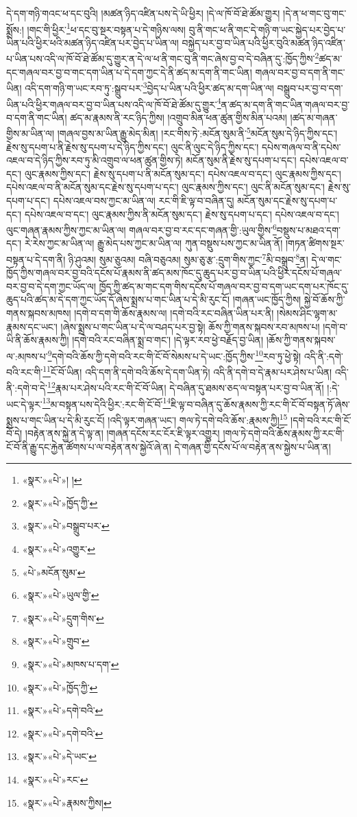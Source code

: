 དེ་དག་གཉི་གའང་ཕ་དང་བུའི། །མཚན་ཉིད་འཛིན་པས་དེ་ཡི་ཕྱིར། །དེ་ལ་ཁོ་བོ་ཐེ་ཚོམ་གྱུར། །དེ་ན་ཕ་གང་བུ་གང་སྨྲོས:། །གང་གི་ཕྱིར་\footnote{«སྣར་»«པེ་»། །}ཕ་དང་བུ་སྔར་བསྟན་པ་དེ་གཉིས་ལས། བུ་ནི་གང་ཕ་ནི་གང་དེ་གཉི་ག་ཡང་སྐྱེད་པར་བྱེད་པ་ཡིན་པའི་ཕྱིར་ཕའི་མཚན་ཉིད་འཛིན་པར་བྱེད་པ་ཡིན་ལ། བསྐྱེད་པར་བྱ་བ་ཡིན་པའི་ཕྱིར་བུའི་མཚན་ཉིད་འཛིན་པ་ཡིན་པས་འདི་ལ་ཁོ་བོ་ཐེ་ཚོམ་དུ་གྱུར་ན་དེ་ལ་ཕ་ནི་གང་བུ་ནི་གང་ཞེས་བྱ་བ་དེ་བཞིན་དུ་:ཁྱོད་ཀྱིས་\footnote{«སྣར་»«པེ་»ཁྱོད་ཀྱི་}ཚད་མ་དང་གཞལ་བར་བྱ་བ་གང་དག་ཡིན་པ་དེ་དག་ཀྱང་དེ་ནི་ཚད་མ་དག་ནི་གང་ཡིན། གཞལ་བར་བྱ་བ་དག་ནི་གང་ཡིན། འདི་དག་གཉི་ག་ཡང་རབ་ཏུ་:སྒྲུབ་པར་\footnote{«སྣར་»«པེ་»བསྒྲུབ་པར་}བྱེད་པ་ཡིན་པའི་ཕྱིར་ཚད་མ་དག་ཡིན་ལ། བསྒྲུབ་པར་བྱ་བ་དག་ཡིན་པའི་ཕྱིར་གཞལ་བར་བྱ་བ་ཡིན་པས་འདི་ལ་ཁོ་བོ་ཐེ་ཚོམ་དུ་གྱུར་\footnote{«སྣར་»«པེ་»འགྱུར་}ན་ཚད་མ་དག་ནི་གང་ཡིན་གཞལ་བར་བྱ་བ་དག་ནི་གང་ཡིན། ཚད་མ་རྣམས་ནི་རང་ཉིད་ཀྱིས། །འགྲུབ་མིན་ཕན་ཚུན་གྱིས་མིན་པའམ། །ཚད་མ་གཞན་གྱིས་མ་ཡིན་ལ། །གཞལ་བྱས་མ་ཡིན་རྒྱུ་མེད་མིན། །རང་གིས་ཏེ་:མངོན་སུམ་ནི་\footnote{«པེ་»མངོན་སུམ་}མངོན་སུམ་དེ་ཉིད་ཀྱིས་དང་། རྗེས་སུ་དཔག་པ་ནི་རྗེས་སུ་དཔག་པ་དེ་ཉིད་ཀྱིས་དང་། ལུང་ནི་ལུང་དེ་ཉིད་ཀྱིས་དང་། དཔེས་གཞལ་བ་ནི་དཔེས་འཇལ་བ་དེ་ཉིད་ཀྱིས་རབ་ཏུ་མི་འགྲུབ་ལ་ཕན་ཚུན་གྱིས་ཏེ། མངོན་སུམ་ནི་རྗེས་སུ་དཔག་པ་དང་། དཔེས་འཇལ་བ་དང་། ལུང་རྣམས་ཀྱིས་དང་། རྗེས་སུ་དཔག་པ་ནི་མངོན་སུམ་དང་། དཔེས་འཇལ་བ་དང་། ལུང་རྣམས་ཀྱིས་དང་། དཔེས་འཇལ་བ་ནི་མངོན་སུམ་དང་རྗེས་སུ་དཔག་པ་དང་། ལུང་རྣམས་ཀྱིས་དང་། ལུང་ནི་མངོན་སུམ་དང་། རྗེས་སུ་དཔག་པ་དང་། དཔེས་འཇལ་བས་ཀྱང་མ་ཡིན་ལ། རང་གི་ཇི་ལྟ་བ་བཞིན་དུ། མངོན་སུམ་དང་རྗེས་སུ་དཔག་པ་དང་། དཔེས་འཇལ་བ་དང་། ལུང་རྣམས་ཀྱིས་ནི་མངོན་སུམ་དང་། རྗེས་སུ་དཔག་པ་དང་། དཔེས་འཇལ་བ་དང་། ལུང་གཞན་རྣམས་ཀྱིས་ཀྱང་མ་ཡིན་ལ། གཞལ་བར་བྱ་བ་རང་དང་གཞན་གྱི་:ཡུལ་གྱིས་\footnote{«སྣར་»«པེ་»ཡུལ་གྱི་}བསྡུས་པ་མཐའ་དག་དང་། རེ་རེས་ཀྱང་མ་ཡིན་ལ། རྒྱུ་མེད་པས་ཀྱང་མ་ཡིན་ལ། ཀུན་བསྡུས་པས་ཀྱང་མ་ཡིན་ནོ། །གཏན་ཚིགས་སྔར་བསྟན་པ་དེ་དག་ནི། ཉི་ཤུའམ། སུམ་ཅུའམ། བཞི་བཅུའམ། སུམ་ཅུ་རྩ་:དྲུག་གིས་ཀྱང་\footnote{«སྣར་»«པེ་»དྲུག་གིས་}མི་བསྒྲུབ་\footnote{«སྣར་»«པེ་»གྲུབ་}ན། དེ་ལ་གང་ཁྱོད་ཀྱིས་གཞལ་བར་བྱ་བའི་དངོས་པོ་རྣམས་ནི་ཚད་མས་ཁོང་དུ་ཆུད་པར་བྱ་བ་ཡིན་པའི་ཕྱིར་དངོས་པོ་གཞལ་བར་བྱ་བ་དེ་དག་ཀྱང་ཡོད་ལ། ཁྱོད་ཀྱི་ཚད་མ་གང་དག་གིས་དངོས་པོ་གཞལ་བར་བྱ་བ་དག་ཡང་དག་པར་ཁོང་དུ་ཆུད་པའི་ཚད་མ་དེ་དག་ཀྱང་ཡོད་དོ་ཞེས་སྨྲས་པ་གང་ཡིན་པ་དེ་མི་རུང་ངོ། །གཞན་ཡང་ཁྱོད་ཀྱིས། སྐྱེ་བོ་ཆོས་ཀྱི་གནས་སྐབས་མཁས། །དགེ་བ་དག་གི་ཆོས་རྣམས་ལ། །དགེ་བའི་རང་བཞིན་ཡིན་པར་ནི། །སེམས་ཤིང་ལྷག་མ་རྣམས་དང་ཡང་། །ཞེས་སྨྲས་པ་གང་ཡིན་པ་དེ་ལ་བཤད་པར་བྱ་སྟེ། ཆོས་ཀྱི་གནས་སྐབས་རབ་མཁས་པ། །དགེ་བ་ཡི་ནི་ཆོས་རྣམས་ཀྱི། །དགེ་བའི་རང་བཞིན་སྨྲ་བ་གང་། །དེ་ལྟར་རབ་ཕྱེ་བརྗོད་བྱ་ཡིན། །ཆོས་ཀྱི་གནས་སྐབས་ལ་:མཁས་པ་\footnote{«སྣར་»«པེ་»མཁས་པ་དག་}དགེ་བའི་ཆོས་ཀྱི་དགེ་བའི་རང་གི་ངོ་བོ་སེམས་པ་དེ་ཡང་:ཁྱོད་ཀྱིས་\footnote{«སྣར་»«པེ་»ཁྱོད་ཀྱི་}རབ་ཏུ་ཕྱེ་སྟེ། འདི་ནི་:དགེ་བའི་རང་གི་\footnote{«སྣར་»«པེ་»དགེ་བའི་}ངོ་བོ་ཡིན། འདི་དག་ནི་དགེ་བའི་ཆོས་དེ་དག་ཡིན་ཏེ། འདི་ནི་དགེ་བ་དེ་རྣམ་པར་ཤེས་པ་ཡིན། འདི་ནི་:དགེ་བ་དེ་\footnote{«སྣར་»«པེ་»དགེ་བའི་}རྣམ་པར་ཤེས་པའི་རང་གི་ངོ་བོ་ཡིན། དེ་བཞིན་དུ་ཐམས་ཅད་ལ་བསྟན་པར་བྱ་བ་ཡིན་ནོ། །:དེ་ཡང་དེ་ལྟར་\footnote{«སྣར་»«པེ་»དེ་ཡང་}མ་བསྟན་པས་དེའི་ཕྱིར་:རང་གི་ངོ་བོ་\footnote{«སྣར་»«པེ་»རང་}ཇི་ལྟ་བ་བཞིན་དུ་ཆོས་རྣམས་ཀྱི་རང་གི་ངོ་བོ་བསྟན་ཏོ་ཞེས་སྨྲས་པ་གང་ཡིན་པ་དེ་མི་རུང་ངོ། །འདི་ལྟར་གཞན་ཡང་། གལ་ཏེ་དགེ་བའི་ཆོས་:རྣམས་ཀྱི།\footnote{«སྣར་»«པེ་»རྣམས་ཀྱིས།} །དགེ་བའི་རང་གི་ངོ་བོ་དེ། །བརྟེན་ནས་སྐྱེ་ན་དེ་ལྟ་ན། །གཞན་དངོས་རང་ངོར་ཇི་ལྟར་འགྱུར། །གལ་ཏེ་དགེ་བའི་ཆོས་རྣམས་ཀྱི་རང་གི་ངོ་བོ་ནི་རྒྱུ་དང་རྐྱེན་ཚོགས་པ་ལ་བརྟེན་ནས་སྐྱེའོ་ཞེ་ན། དེ་གཞན་གྱི་དངོས་པོ་ལ་བརྟེན་ནས་སྐྱེས་པ་ཡིན་ན། 
